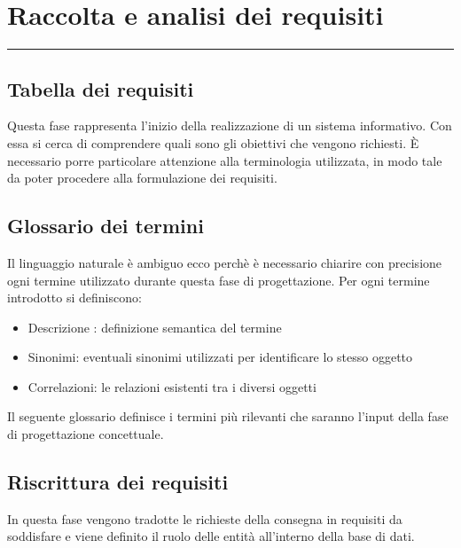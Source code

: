 \documentclass[a4paper]{article}
\begin{document}
\newpage
\section{Raccolta e analisi dei requisiti}
\rule{\linewidth}{1.5pt}
\subsection{Tabella dei requisiti}
Questa fase rappresenta l’inizio della realizzazione di un sistema informativo. Con essa si cerca di comprendere quali sono gli obiettivi che vengono richiesti. 
È necessario porre particolare attenzione alla terminologia utilizzata, in modo tale da poter procedere alla formulazione dei requisiti.

\subsection{Glossario dei termini}
Il linguaggio naturale è ambiguo ecco perchè è necessario chiarire con precisione ogni termine utilizzato durante questa fase di progettazione.
Per ogni termine introdotto si definiscono:
\begin{itemize}
    \item Descrizione : definizione semantica del termine
    \item Sinonimi: eventuali sinonimi utilizzati per identificare lo stesso oggetto
    \item Correlazioni: le relazioni esistenti tra i diversi oggetti
\end{itemize}
\medskip
Il seguente glossario definisce i termini più rilevanti che saranno l’input della fase di progettazione concettuale.




\subsection{Riscrittura dei requisiti}
In questa fase vengono tradotte le richieste della consegna in requisiti da soddisfare e viene definito il ruolo delle entità all’interno della base di dati.
\end{document}
